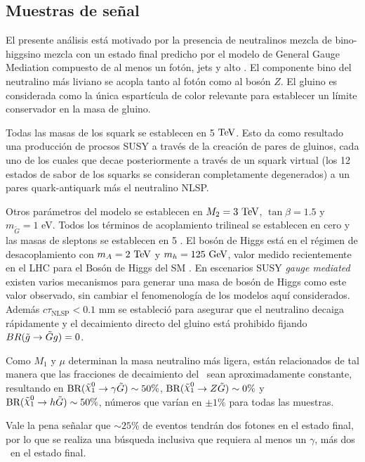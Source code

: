 \subsection{Muestras de señal}
\label{sec:signal}


El presente análisis está motivado por la presencia de neutralinos mezcla de bino-higgsino
mezcla con un estado final predicho por el modelo de General Gauge Mediation
compuesto de al menos un
fotón, jets y alto \met. El componente bino del neutralino más liviano se acopla tanto al fotón como al bosón $Z$. El gluino es
considerada como la única espartícula de color relevante para establecer un
límite conservador en la masa de gluino.

Todas las masas de los squark se establecen en 5 $\text{TeV}$. Esto da como resultado una producción de procsos SUSY a través de la creación de pares de gluinos, cada uno de los cuales
que decae posteriormente a través de un squark virtual (los 12 estados de sabor de los squarks se consideran completamente degenerados) a un
pares quark-antiquark más el neutralino NLSP.

Otros parámetros del modelo se establecen en $M_ {2} = 3\ \text{TeV}$, $ \tan{\beta} = 1.5$ y $m_{\tilde{G}} = 1$ eV.
Todos los términos de acoplamiento trilineal se establecen en cero y las masas de sleptons se establecen en 5 \tev. El bosón de Higgs está en el régimen de desacoplamiento con $m_{A} = 2\ \text{TeV} $ y
$m_{h} = 125\ \text{GeV}$, valor medido recientemente en el LHC para el
Bosón de Higgs del SM \cite{Aad:2015zhl}. En escenarios SUSY \textit{gauge mediated}
existen varios mecanismos \cite{Craig:2011yk, Auzzi:2011eu, Csaki:2012fh, Larsen:2012rq, Craig:2012hc} para generar una masa de bosón de Higgs como este valor observado, sin cambiar el
fenomenología de los modelos aquí considerados. Además $c\tau_{\mathrm{NLSP}}
<0.1$ mm se estableció para asegurar que el neutralino decaiga rápidamente y el
decaimiento directo del gluino está prohibido fijando $BR(\tilde{g} \to \tilde{G} g) = 0$.

Como $M_1$ y $\mu$ determinan la masa neutralino más ligera, están relacionados
de tal manera que las fracciones de decaimiento del \ninoone\ sean aproximadamente
constante, resultando en $\text{BR} (\ninoone \to \gamma \gravino) \sim 50 \%$,
$\text{BR} (\ninoone \to Z\gravino) \sim 0 \% $ y $ \text{BR} (\ninoone \to h
\gravino) \sim 50 \%$, números que varían en $\pm 1 \%$ para todas las muestras.

Vale la pena señalar que $\sim 25 \%$ de eventos tendrán dos fotones en el estado final,
por lo que se realiza una búsqueda inclusiva que requiera al menos un
$\gamma$, más dos \gravino\ en el estado final.

